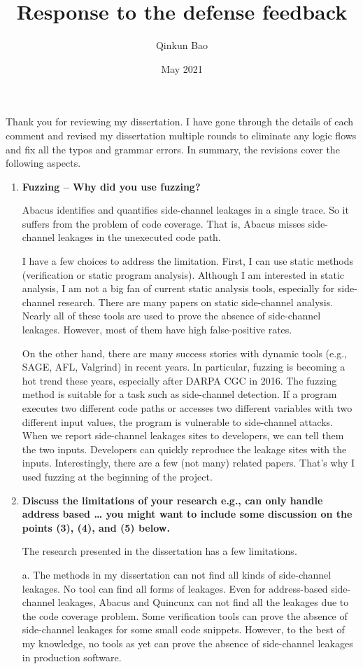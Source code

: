\documentclass{article}
\title{Response to the defense feedback}
\author{Qinkun Bao}
\date{May 2021}
\begin{document}
\maketitle
Thank you for reviewing my dissertation. I have gone through the details of each comment and revised my dissertation multiple rounds to eliminate any logic flows and fix all the typos and grammar errors. In summary, the revisions cover the following aspects.


\begin{enumerate}
\item \textbf{Fuzzing – Why did you use fuzzing?}

Abacus identifies and quantifies side-channel leakages in a single trace. So it suffers from the problem of code coverage.  That is, Abacus misses side-channel leakages in the unexecuted code path. 

I have a few choices to address the limitation. First, I can use static methods (verification or static program analysis). Although I am interested in static analysis, I am not a big fan of current static analysis tools, especially for side-channel research. There are many papers on static side-channel analysis. Nearly all of these tools are used to prove the absence of side-channel leakages. However, most of them have high false-positive rates. 

On the other hand, there are many success stories with dynamic tools (e.g., SAGE, AFL, Valgrind) in recent years. In particular, fuzzing is becoming a hot trend these years, especially after DARPA CGC in 2016. The fuzzing method is suitable for a task such as side-channel detection. If a program executes two different code paths or accesses two different variables with two different input values, the program is vulnerable to side-channel attacks. When we report side-channel leakages sites to developers, we can tell them the two inputs. Developers can quickly reproduce the leakage sites with the inputs.  Interestingly, there are a few (not many) related papers. That's why I used fuzzing at the beginning of the project.


\item \textbf{Discuss the limitations of your research
e.g., can only handle address based …
you might want to include some discussion on the points (3), (4), and (5) below.}

The research presented in the dissertation has a few limitations.

a. The methods in my dissertation can not find all kinds of side-channel leakages. No tool can find all forms of leakages. Even for address-based side-channel leakages, Abacus and Quincunx can not find all the leakages due to the code coverage problem. Some verification tools can prove the absence of side-channel leakages for some small code snippets. However, to the best of my knowledge, no tools as yet can prove the absence of side-channel leakages in production software.


\end{enumerate}
\end{document}

